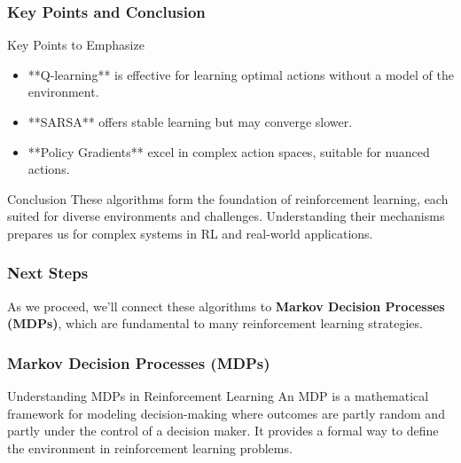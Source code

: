 \documentclass{beamer}
\begin{document}
\begin{frame}[fragile]
    \frametitle{Key Points and Conclusion}
    \begin{block}{Key Points to Emphasize}
        \begin{itemize}
            \item **Q-learning** is effective for learning optimal actions without a model of the environment.
            \item **SARSA** offers stable learning but may converge slower.
            \item **Policy Gradients** excel in complex action spaces, suitable for nuanced actions.
        \end{itemize}
    \end{block}

    \begin{block}{Conclusion}
        These algorithms form the foundation of reinforcement learning, each suited for diverse environments and challenges. Understanding their mechanisms prepares us for complex systems in RL and real-world applications.
    \end{block}
\end{frame}

\begin{frame}[fragile]
    \frametitle{Next Steps}
    As we proceed, we'll connect these algorithms to \textbf{Markov Decision Processes (MDPs)}, which are fundamental to many reinforcement learning strategies.
\end{frame}

\begin{frame}[fragile]
    \frametitle{Markov Decision Processes (MDPs)}
    \begin{block}{Understanding MDPs in Reinforcement Learning}
        An MDP is a mathematical framework for modeling decision-making where outcomes are partly random and partly under the control of a decision maker. 
        It provides a formal way to define the environment in reinforcement learning problems.
    \end{block}
\end{frame}
\end{document}
